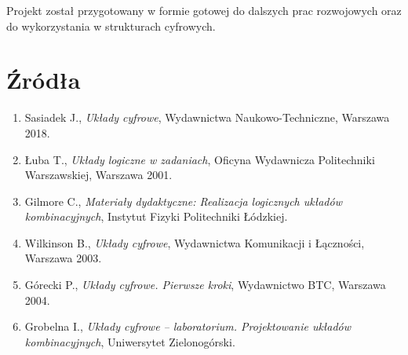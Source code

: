 \documentclass[11pt]{article}
\begin{document}
Projekt został przygotowany w formie gotowej do dalszych prac rozwojowych oraz do wykorzystania w strukturach cyfrowych.

\section{Źródła}

\begin{enumerate}
    \item Sasiadek J., \textit{Układy cyfrowe}, Wydawnictwa Naukowo-Techniczne, Warszawa 2018.
    \item Łuba T., \textit{Układy logiczne w zadaniach}, Oficyna Wydawnicza Politechniki Warszawskiej, Warszawa 2001.
    \item Gilmore C., \textit{Materiały dydaktyczne: Realizacja logicznych układów kombinacyjnych}, Instytut Fizyki Politechniki Łódzkiej.
    \item Wilkinson B., \textit{Układy cyfrowe}, Wydawnictwa Komunikacji i Łączności, Warszawa 2003.
    \item Górecki P., \textit{Układy cyfrowe. Pierwsze kroki}, Wydawnictwo BTC, Warszawa 2004.
    \item Grobelna I., \textit{Układy cyfrowe -- laboratorium. Projektowanie układów kombinacyjnych}, Uniwersytet Zielonogórski.
\end{enumerate}
\end{document}
